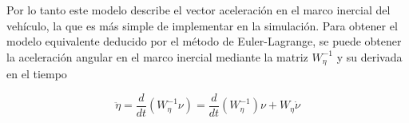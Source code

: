 \documentclass[../main.tex]{subfiles}
\begin{document}
Por lo tanto este modelo describe el vector aceleración en el marco
inercial del vehículo, la que es más simple de implementar en la simulación.
Para obtener el modelo equivalente deducido por el método de Euler-Lagrange,
se puede obtener la aceleración angular en el marco inercial mediante
la matriz $W_{\eta}^{-1}$ y su derivada en el tiempo 

\begin{equation}
\ddot{\eta}=\frac{d}{dt}(W_{\eta}^{-1}\nu)=\frac{d}{dt}(W_{\eta}^{-1})\nu+W_{\eta}\dot{\nu}
\end{equation}

\textcompwordmark{}
\end{document}
